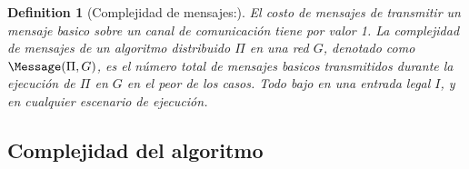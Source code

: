 \documentclass[10pt]{report}
\newtheorem{definition}{Definition}
\begin{document}
    \begin{definition}
        [Complejidad de mensajes:] El costo de mensajes de transmitir un mensaje basico sobre un canal de
        comunicación tiene por valor 1. La complejidad de mensajes de un algoritmo distribuido $\Pi$ en una red $G$,
        denotado como $\Message(\Pi,G)$, es el número total de mensajes basicos transmitidos durante la ejecución de $\Pi$
        en $G$ en el peor de los casos.
        Todo bajo en una entrada legal $I$, y en cualquier escenario de ejecución.
    \end{definition}

    \subsection{Complejidad del algoritmo}\label{subsec:complejidad-del-algoritmo}
\end{document}
